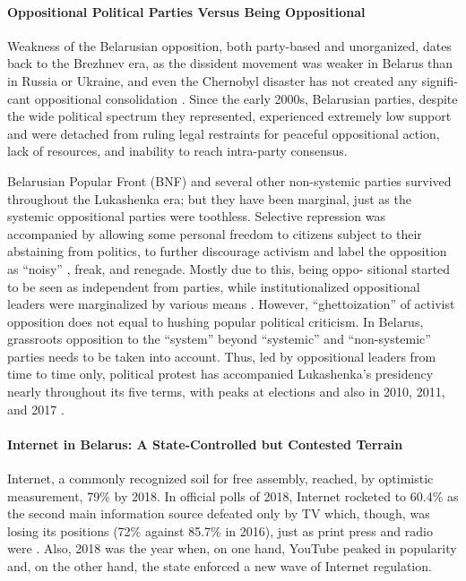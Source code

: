 \paragraph{Oppositional Political Parties Versus Being Oppositional}
Weakness of the Belarusian opposition, both party-based and unorganized, dates back to the Brezhnev era, as the dissident movement was weaker in Belarus than in Russia or Ukraine, and even the Chernobyl disaster has not created any signifi- cant oppositional consolidation \cite{KorostelevaLawsonMarsh}. Since the early 2000s, Belarusian parties, despite the wide political spectrum they represented, experienced extremely low support and were detached from ruling legal restraints for peaceful oppositional action, lack of resources, and inability to reach intra-party consensus.

Belarusian Popular Front (BNF) and several other non-systemic parties survived throughout the Lukashenka era; but they have been marginal, just as the systemic oppositional parties were toothless. Selective repression was accompanied by allowing some personal freedom to citizens subject to their abstaining from politics, to further discourage activism and label the opposition as “noisy” \cite[p.~381]{Bedford}, freak, and renegade. Mostly due to this, being oppo- sitional started to be seen as independent from parties, while institutionalized oppositional leaders were marginalized by various means \cite[p.~5]{Kazharski}. However, “ghettoization” of activist opposition \cite{BedfordVinatier} does not equal to hushing popular political criticism. In Belarus, grassroots opposition to the “system” beyond “systemic” and “non-systemic” parties needs to be taken into account. Thus, led by oppositional leaders from time to time only, political protest has accompanied Lukashenka’s presidency nearly throughout its five terms, with peaks at elections and also in 2010, 2011, and 2017 \cite[p.~6]{Kazharski}.

\paragraph{Internet in Belarus: A State-Controlled but Contested Terrain}
Internet, a commonly recognized soil for free assembly, reached, by optimistic measurement, 79\% \cite{Smorgunov} by 2018. In official polls of 2018, Internet rocketed to 60.4\% as the second main information source defeated only by TV which, though, was losing its positions (72\% against 85.7\% in 2016), just as print press and radio were \cite[p.~190]{Hradziushka}. Also, 2018 was the year when, on one hand, YouTube peaked in popularity and, on the other hand, the state enforced a new wave of Internet regulation.


